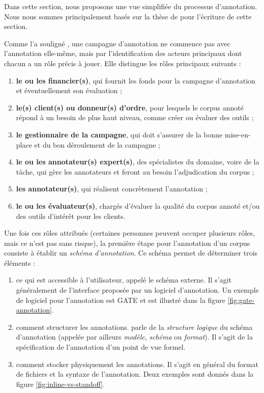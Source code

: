\documentclass[PhD-Yoann-Dupont.tex]{subfiles}
\begin{document}
Dans cette section, nous proposons une vue simplifiée du processus d'annotation. Nous nous sommes principalement basés sur la thèse de \citet{fort2012ressources} pour l'écriture de cette section.

Comme l'a souligné \citet{fort2012ressources}, une campagne d'annotation ne commence pas avec l'annotation elle-même, mais par l'identification des acteurs principaux dont chacun a un rôle précis à jouer. Elle distingue les rôles principaux suivants :

\begin{enumerate}
    \item \textbf{le ou les financier(s)}, qui fournit les fonds pour la campagne d'annotation et éventuellement son évaluation ;
    \item \textbf{le(s) client(s) ou donneur(s) d'ordre}, pour lesquels le corpus annoté répond à un besoin de plus haut niveau, comme créer ou évaluer des outils ;
    \item \textbf{le gestionnaire de la campagne}, qui doit s'assurer de la bonne mise-en-place et du bon déroulement de la campagne ;
    \item \textbf{le ou les annotateur(s) expert(s)}, des spécialistes du domaine, voire de la tâche, qui gère les annotateurs et feront au besoin l'adjudication du corpus ;
    \item \textbf{les annotateur(s)}, qui réalisent concrètement l'annotation ;
    \item \textbf{le ou les évaluateur(s)}, chargés d'évaluer la qualité du corpus annoté et/ou des outils d'intérêt pour les clients.
\end{enumerate}

Une fois ces rôles attribués (certaines personnes peuvent occuper plusieurs rôles, mais ce n'est pas sans risque), la première étape pour l'annotation d'un corpus consiste à établir un \emph{schéma d'annotation}. Ce schéma permet de déterminer trois éléments :

\begin{enumerate}
    \item ce qui est accessible à l'utilisateur, appelé le schéma externe. Il s'agit généralement de l'interface proposée par un logiciel d'annotation. Un exemple de logiciel pour l'annotation est GATE \citep{cunningham2002gate} et est illustré dans la figure \ref{fig:gate-annotation}.
    \item comment structurer les annotations. \citet{fort2012ressources} parle de la \emph{structure logique} du schéma d'annotation (appelée par ailleurs \emph{modèle}, \emph{schéma} ou \emph{format}). Il s'agit de la spécification de l'annotation d'un point de vue formel.
    \item comment stocker physiquement les annotations. Il s'agit en général du format de fichiers et la syntaxe de l'annotation. Deux exemples sont donnés dans la figure \ref{fig:inline-vs-standoff}.
\end{enumerate}
\end{document}
